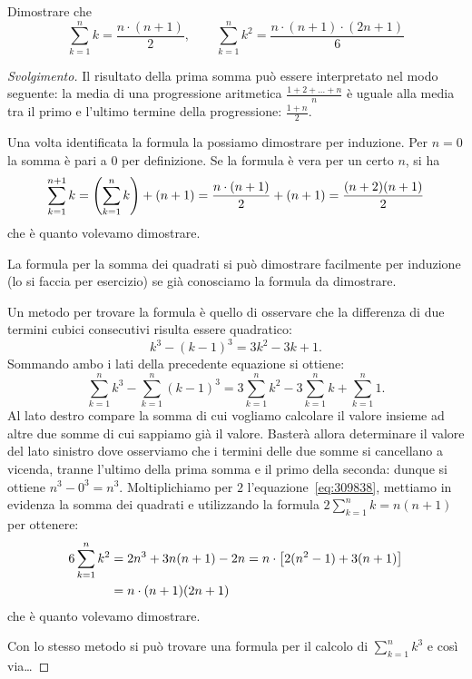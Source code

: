 \begin{exercise}
  Dimostrare che 
  \[
    \sum_{k=1}^n k = \frac{n\cdot (n+1)}{2}, \qquad
    \sum_{k=1}^n k^2 = \frac{n\cdot (n+1)\cdot (2n+1)}{6}
  \]
\end{exercise}
\begin{proof}[Svolgimento]
Il risultato della prima somma può essere interpretato nel modo seguente:
la media di una progressione aritmetica $\frac{1+2+ \dots + n}{n}$ 
è uguale alla media tra il primo 
e l'ultimo termine della progressione: $\frac{1+n}{2}$.

Una volta identificata la formula la possiamo dimostrare per induzione.
Per $n=0$ la somma è pari a $0$ per definizione.
Se la formula è vera per un certo $n$, si ha 
\[
  \sum_{k=1}^{n+1} k = {\left( \sum_{k=1}^n k \right)} + (n+1)
   = \frac{n\cdot(n+1)}{2} + (n+1) 
   = \frac{(n+2)(n+1)}{2}
\]
che è quanto volevamo dimostrare.

La formula per la somma dei quadrati si può dimostrare facilmente per 
induzione (lo si faccia per esercizio) se già conosciamo la formula da 
dimostrare.

Un metodo per trovare la formula è quello di osservare che la differenza 
di due termini cubici consecutivi risulta essere quadratico:
\[
k^3 - (k-1)^3 = 3 k^2 - 3k + 1.  
\]
Sommando ambo i lati della precedente equazione si ottiene:
\begin{equation}\label{eq:309838}
\sum_{k=1}^n k^3 - \sum_{k=1}^n (k-1)^3 = 3\sum_{k=1}^n k^2-3\sum_{k=1}^n k+\sum_{k=1}^n 1.
\end{equation}
Al lato destro compare la somma di cui vogliamo calcolare il valore 
insieme ad altre due somme di cui sappiamo già il valore. 
Basterà allora determinare il valore del lato sinistro dove 
osserviamo che i termini delle due somme si cancellano 
a vicenda,
tranne l'ultimo della prima somma 
e il primo della seconda: dunque si ottiene $n^3 - 0^3=n^3$.
Moltiplichiamo per $2$ l'equazione~\eqref{eq:309838},
mettiamo in evidenza la somma dei quadrati e 
utilizzando la formula $2\sum_{k=1}^n k = n(n+1)$
per ottenere:
\begin{align*}
  6 \sum_{k=1}^n k^2 
  &=  2n^3 + 3 n(n+1) - 2n
  = n \cdot {\left[ 2(n^2-1) + 3(n+1) \right]}\\
  &= n \cdot (n+1)(2n+1)
\end{align*}
che è quanto volevamo dimostrare.

Con lo stesso metodo si può trovare una formula per il calcolo 
di $\sum_{k=1}^n k^3$ e così via\dots
\end{proof}

